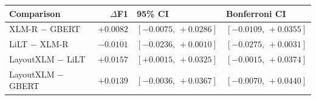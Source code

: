 \begin{tabular}{@{}lrll@{}}
\toprule
Comparison & $\Delta$F1 & 95\% CI & Bonferroni CI \\
\midrule
XLM-R $-$ GBERT & $+0.0082$ & $[-0.0075,\,+0.0286]$ & $[-0.0109,\,+0.0355]$ \\
LiLT $-$ XLM-R & $-0.0101$ & $[-0.0236,\,+0.0010]$ & $[-0.0275,\,+0.0031]$ \\
LayoutXLM $-$ LiLT & $+0.0157$ & $[+0.0015,\,+0.0325]$ & $[-0.0015,\,+0.0374]$ \\
LayoutXLM $-$ GBERT & $+0.0139$ & $[-0.0036,\,+0.0367]$ & $[-0.0070,\,+0.0440]$ \\
\bottomrule
\end{tabular}
